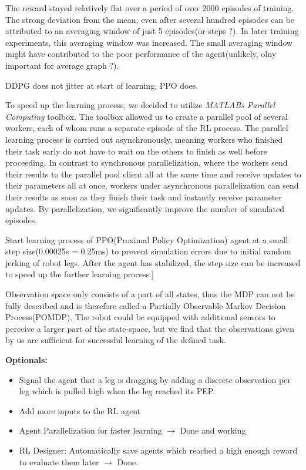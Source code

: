The reward stayed relatively flat over a period of over 2000 episodes of training.
The strong deviation from the mean, even after several hundred episodes can be attributed to an averaging window of just 5 episodes(or steps ?). 
In later training experiments, this averaging window was increased.
The small averaging window might have contributed to the poor performance of the agent(unlikely, olny important for average graph ?).

DDPG does not jitter at start of learning, PPO does.

To speed up the learning process, we decided to utilize \textit{MATLABs Parallel Computing} toolbox.
The toolbox allowed us to create a parallel pool of several workers, each of whom runs a separate episode of the RL process.
The parallel learning process is carried out asynchronously, meaning workers who finished their task early do not have to wait on the others to finish as well before proceeding.
In contrast to synchronous parallelization, where the workers send their results to the parallel pool client all at the same time and receive updates to their parameters all at once, workers under asynchronous parallelization can send their results as soon as they finish their task and instantly receive parameter updates.
By parallelization, we significantly improve the number of simulated episodes.



Start learning process of PPO(Proximal Policy Optimization) agent at a small step size(0.00025s = 0.25ms) to prevent simulation errors due to initial random jerking of robot legs.
After the agent has stabilized, the step size can be increased to speed up the further learning process.]


Observation space only consists of a part of all states, thus the MDP can not be fully described and is therefore called a Partially Observable Markov Decision Process(POMDP).
The robot could be equipped with additional sensors to perceive a larger part of the state-space, but we find that the observations given by us are sufficient for successful learning of the defined task.


\cite{lillicrap2015continuous}





\textbf{Optionals:}

\begin{itemize}
	\item Signal the agent that a leg is dragging by adding a discrete observation per leg which is pulled high when the leg reached its PEP.
	
	\item Add more inputs to the RL agent
	
	\item Agent Parallelization for faster learning $\rightarrow$ Done and working
	
	\item RL Designer: Automatically save agents which reached a high enough reward to evaluate them later $\rightarrow$ Done.
	
\end{itemize}




